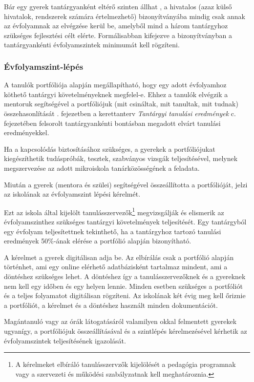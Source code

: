 Bár egy gyerek tantárgyanként eltérő szinten állhat , a hivatalos (azaz külső
hivatalok, rendszerek számára értelmezhető) bizonyítványába mindig csak annak
az évfolyamnak az elvégzése kerül be, amelyből mind a három tantárgyhoz
szükséges fejlesztési célt elérte. Formálisabban kifejezve a bizonyítványban a
tantárgyankénti évfolyamszintek minimumát kell rögzíteni.

\subsubsection{Évfolyamszint-lépés}
\label{sec:evfolyamszintlepes}
A tanulók portfóliója alapján megállapítható, hogy egy adott évfolyamhoz
köthető tantárgyi követelményeknek megfelel-e.
Ehhez a tanulók elvégzik a mentoruk segítségével a portfóliójuk (mit csináltak,
mit tanultak, mit tudnak) összehasonlítását \ifkerettanterv
      .
      fejezetben
\else
      a kerettanterv \emph{Tantárgyi tanulási eredmények} c. fejezetében
\fi
felsorolt tantárgyankénti bontásban megadott elvárt tanulási eredményekkel.

Ha a kapcsolódás biztosításához szükséges, a gyerekek a portfóliójukat
kiegészíthetik tudáspróbák, tesztek, szabványos vizsgák teljesítésével, melynek
megszervezése az adott mikroiskola tanárközösségének a feladata.

Miután a gyerek (mentora és szülei) segítségével összeállította a portfólióját,
jelzi az iskolának az évfolyamszint lépési kérelmét.

Ezt az iskola által kijelölt tanulásszervezők\footnote{A kérelmeket elbíráló
      tanulásszervzők kijelölését a pedagógia programnak vagy a szervezeti és
      működési szabályzatnak kell meghatároznia.}  
megvizsgálják és elismerik az
évfolyamszinthez szükséges tantárgyi követelmények teljesítését.
Egy tantárgyból egy évfolyam teljesítettnek tekinthető, ha a tantárgyhoz
tartozó tanulási eredmények 50\%-ának elérése a portfólió alapján bizonyítható.

A kérelmet a gyerek digitálisan adja be.
Az elbírálás csak a portfólió alapján történhet, ami egy
online elérhető adatbázisként tartalmaz mindent, ami a döntéshez szükséges
lehet. A döntéshez így a tanulásszervezőknek és a gyereknek nem
kell egy időben és egy helyen lennie. Minden esetben szükséges a portfóliót és
a teljes folyamatot digitálisan rögzíteni.
Az iskolának két évig meg kell őriznie a portfóliót, a kérelmet és a döntéshez
használt minden dokumentációt.

Magántanuló vagy az órák látogatásáról valamilyen okkal
felmentett gyerekek ugyanígy, a portfóliójuk összeállításával és a szintlépés
kérelmezésével kérhetik az évfolyamszintek teljesítésének igazolását.

